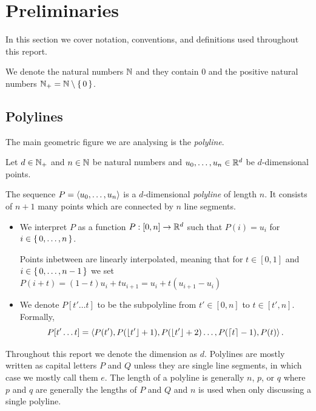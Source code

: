 \section{Preliminaries}
\label{sec:preliminaries}

In this section we cover notation, conventions, and definitions used throughout this report.  

We denote the natural numbers \(\mathbb{N}\) and they contain \(0\) and the positive natural numbers \(\mathbb{N}_+ = \mathbb{N} \setminus\set{0}\).

\subsection{Polylines}
\label{ssec:polylines}
The main geometric figure we are analysing is the \emph{polyline}.
\begin{definition}[Polyline]
  Let \(d\in \mathbb{N}_+\) and \(n \in \mathbb{N}\) be natural numbers and \(u_0, \dots, u_n \in \mathbb{R}^d\) be \(d\)-dimensional points. 

  The sequence \(P = \left\langle u_0, \dots, u_n\right\rangle\) is a \(d\)-dimensional \emph{polyline} of length \(n\). It consists of \(n+1\) many points which are connected by \(n\) line segments. 
  \begin{itemize}
    \item We interpret \(P\) as a function \(P:[0,n] \to \mathbb{R}^d\) such that \(P(i) = u_i\) for \(i \in \set{0, \dots, n}\).

      Points inbetween are linearly interpolated, meaning that for \(t \in [0, 1]\) and \(i \in \set{0, \dots, n - 1}\) we set \(P(i + t) = (1- t)u_i + t u_{i+1} = u_i + t(u_{i+1} - u_i)\)
    \item We denote \(P[t'\dots t]\) to be the subpolyline from \(t' \in [0, n]\) to \(t \in [t', n]\). Formally, \[P[t'\dots t] = \left\langle P(t'), P(\left\lfloor t'\right\rfloor + 1),  P(\left\lfloor t'\right\rfloor + 2) \dots, P(\left\lceil t\right\rceil - 1), P(t)\right\rangle.\]

  \end{itemize}

\end{definition}
Throughout this report we denote the dimension as \(d\). Polylines are mostly written as capital letters \(P\) and \(Q\) unless they are single line segments, in which case we mostly call them \(e\). The length of a polyline is generally \(n\), \(p\), or \(q\) where \(p\) and \(q\) are generally the lengths of \(P\) and \(Q\) and \(n\) is used when only discussing a single polyline.


